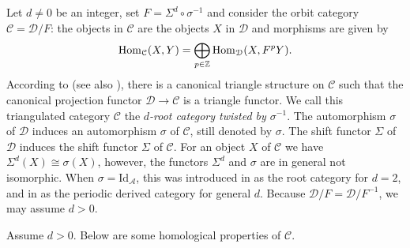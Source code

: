 \documentclass[reqno,12pt,a4paper]{amsart}
\theoremstyle{remark}
\theoremstyle{definition}
\newcommand{\ca}{{\mathcal A}}
\newcommand{\cc}{{\mathcal C}}
\newcommand{\cd}{{\mathcal D}}
\numberwithin{equation}{section}
\begin{document}
Let $d\neq 0$ be an integer, set $F=\Sigma^d\circ \sigma^{-1}$ and consider the orbit category  $\mathcal{C}=\mathcal{D}/F$: the objects in $\mathcal{C}$ are the objects $X$ in $\mathcal{D}$ and morphisms are given by
\[{\rm Hom}_\mathcal{C}(X,Y)=\bigoplus_{p\in \mathbb{Z}}{\rm Hom}_\mathcal{D}(X,F^pY).\]
According to \cite[Section 9]{Keller05} (see also \cite[Section 4]{ChenYang25}), there is a canonical triangle structure on $\mathcal{C}$ such that the canonical projection functor $\cd\to\cc$ is a triangle functor. We call this triangulated category $\cc$  the \emph{$d$-root category twisted by $\sigma^{-1}$}. The automorphism $\sigma$ of $\cd$ induces an automorphism $\sigma$ of $\cc$, still denoted by $\sigma$. The shift functor $\Sigma$ of $\cd$ induces the shift functor $\Sigma$ of $\cc$. For an object $X$ of $\cc$ we have $\Sigma^d(X)\cong \sigma(X)$, however, the functors $\Sigma^d$ and $\sigma$ are in general not isomorphic. When $\sigma=\mathrm{Id}_\ca$, this was introduced in \cite{PengXiao97,PengXiao00} as the root category for $d=2$, and in \cite{Zhang25} as the periodic derived category for general $d$. Because $\mathcal{D}/F=\mathcal{D}/F^{-1}$, we may assume $d>0$.

Assume $d>0$. Below are some homological properties of $\cc$.
\end{document}
